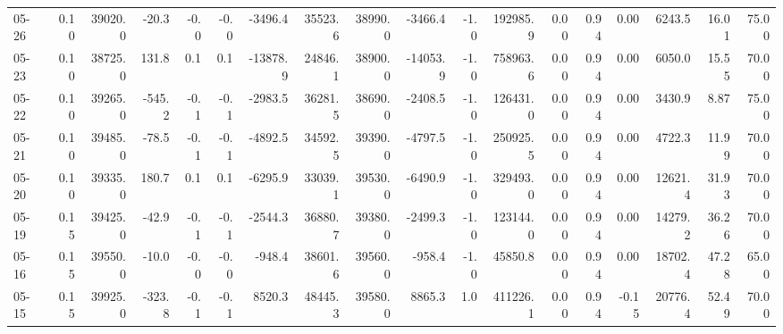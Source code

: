 \begin{threeparttable}
{\begin{tabular}{lrrrrrrrrrrrrrrrrr}
  05-26 &     0.10 & 39020.0 &             -20.3 &              -0.0 &               -0.0 &            -3496.4 & 35523.6 & 38990.0 &    -3466.4 &                     -1.0 &            192985.9 &       0.00 &      0.94 &           0.00 &           6243.5 &           16.01 &                  75.00 \\
  05-23 &     0.10 & 38725.0 &             131.8 &               0.1 &                0.1 &           -13878.9 & 24846.1 & 38900.0 &   -14053.9 &                     -1.0 &            758963.6 &       0.00 &      0.94 &           0.00 &           6050.0 &           15.55 &                  70.00 \\
  05-22 &     0.10 & 39265.0 &            -545.2 &              -0.1 &               -0.1 &            -2983.5 & 36281.5 & 38690.0 &    -2408.5 &                     -1.0 &            126431.0 &       0.00 &      0.94 &           0.00 &           3430.9 &            8.87 &                  75.00 \\
  05-21 &     0.10 & 39485.0 &             -78.5 &              -0.1 &               -0.1 &            -4892.5 & 34592.5 & 39390.0 &    -4797.5 &                     -1.0 &            250925.5 &       0.00 &      0.94 &           0.00 &           4722.3 &           11.99 &                  70.00 \\
  05-20 &     0.10 & 39335.0 &             180.7 &               0.1 &                0.1 &            -6295.9 & 33039.1 & 39530.0 &    -6490.9 &                     -1.0 &            329493.0 &       0.00 &      0.94 &           0.00 &          12621.4 &           31.93 &                  70.00 \\
  05-19 &     0.15 & 39425.0 &             -42.9 &              -0.1 &               -0.1 &            -2544.3 & 36880.7 & 39380.0 &    -2499.3 &                     -1.0 &            123144.0 &       0.00 &      0.94 &           0.00 &          14279.2 &           36.26 &                  70.00 \\
  05-16 &     0.15 & 39550.0 &             -10.0 &              -0.0 &               -0.0 &             -948.4 & 38601.6 & 39560.0 &     -958.4 &                     -1.0 &             45850.8 &       0.00 &      0.94 &           0.00 &          18702.4 &           47.28 &                  65.00 \\
  05-15 &     0.15 & 39925.0 &            -323.8 &              -0.1 &               -0.1 &             8520.3 & 48445.3 & 39580.0 &     8865.3 &                      1.0 &            411226.1 &       0.00 &      0.94 &          -0.15 &          20776.4 &           52.49 &                  70.00 \\

\end{tabular}}
\end{threeparttable}
